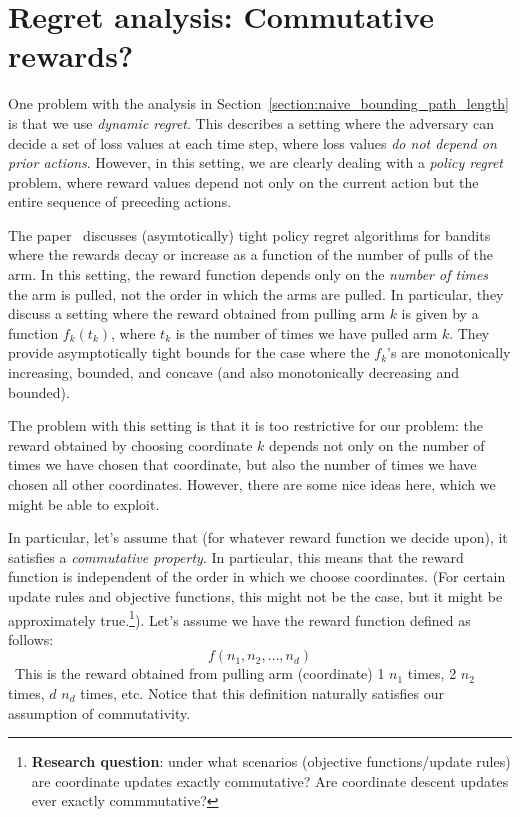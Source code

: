 \documentclass[letterpaper]{article}
\begin{document}
\section{Regret analysis: Commutative rewards?}
One problem with the analysis in Section~\ref{section:naive_bounding_path_length} is that we use \emph{dynamic regret}. This describes a setting where the adversary can decide a set of loss values at each time step, where loss values \emph{do not depend on prior actions}. However, in this setting, we are clearly dealing with a \emph{policy regret} problem, where reward values depend not only on the current action but the entire sequence of preceding actions. 

The paper~\cite{heidari2016tight_policy_regret} discusses (asymtotically) tight policy regret algorithms for bandits where the rewards decay or increase as a function of the number of pulls of the arm. In this setting, the reward function depends only on the \emph{number of times} the arm is pulled, not the order in which the arms are pulled. 
In particular, they discuss a setting where the reward obtained from pulling arm $k$ is given by a function $f_k(t_k)$, where $t_k$ is the number of times we have pulled arm $k$. They provide asymptotically tight bounds for the case where the $f_k$'s are monotonically increasing, bounded, and concave (and also monotonically decreasing and bounded).

The problem with this setting is that it is too restrictive for our problem: the reward obtained by choosing coordinate $k$ depends not only on the number of times we have chosen that coordinate, but also the number of times we have chosen all other coordinates. However, there are some nice ideas here, which we might be able to exploit.

In particular, let's assume that (for whatever reward function we decide upon), it satisfies a \emph{commutative property}. In particular, this means that the reward function is independent of the order in which we choose coordinates. (For certain update rules and objective functions, this might not be the case, but it might be approximately true.\footnote{\textbf{Research question}: under what scenarios (objective functions/update rules) are coordinate updates exactly commutative? Are coordinate descent updates ever exactly commmutative?}). Let's assume we have the reward function defined as follows:
\begin{equation}
    f(n_1, n_2, \ldots, n_d)
\end{equation}\
This is the reward obtained from pulling arm (coordinate) 1 $n_1$ times, 2 $n_2$ times, $d$ $n_d$ times, etc. Notice that this definition naturally satisfies our assumption of commutativity.
\end{document}
